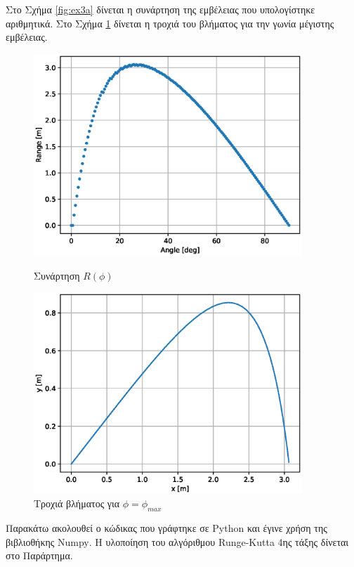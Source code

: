 \documentclass[assignment4.tex]{subfiles}
\begin{document}
Στο Σχήμα \ref{fig:ex3a} δίνεται η συνάρτηση της εμβέλειας που υπολογίστηκε αριθμητικά. Στο Σχήμα \ref{fig:ex3b} δίνεται η τροχιά του βλήματος για την γωνία μέγιστης εμβέλειας.
\begin{figure}[hp]
	\includegraphics[width=0.9\textwidth]{ex3a.eps}
	\centering
	\caption{Συνάρτηση $R(\phi)$}
	\label{fig:ex3a}
	\includegraphics[width=0.9\textwidth]{ex3b.eps}
	\centering
	\caption{Τροχιά βλήματος για $\phi = \phi_{max}$}
	\label{fig:ex3b}
\end{figure}

Παρακάτω ακολουθεί ο κώδικας που γράφτηκε σε \textlatin{Python} και έγινε χρήση της βιβλιοθήκης \textlatin{Numpy}. Η υλοποίηση του αλγόριθμου \textlatin{Runge-Kutta} 4ης τάξης δίνεται στο Παράρτημα.

\end{document}
